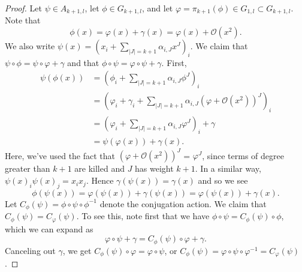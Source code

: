 \documentclass[10pt,a4paper]{amsart}
\begin{document}
\begin{proof}
Let $\psi \in A_{k+1, l}$, let $\phi \in G_{k+1, l}$, and let $\varphi = \pi_{k+1}(\phi) \in G_{1,l} \subset G_{k+1,l}$. Note that 
\[
\phi(x) = \varphi(x) + \gamma(x) =\varphi(x) + \mathcal{O}(x^2). 
\]
We also write $\psi(x) = (x_{i} + \sum_{|J| = k+1} \alpha_{i, J} x^{J} )_{i}$. We claim that $\psi \circ \phi = \psi \circ \varphi + \gamma$ and that $\phi \circ \psi = \varphi \circ \psi + \gamma$. 
First, 
\begin{align*}
\psi (\phi(x)) &=  (\phi_{i} + \sum_{|J| = k+1} \alpha_{i, J} \phi^{J} )_{i} \\
&= (\varphi_{i} + \gamma_{i} + \sum_{|J| = k+1 } \alpha_{i, J} (\varphi + \mathcal{O}(x^2))^J)_{i} \\
&= (\varphi_{i} + \sum_{|J| = k+1} \alpha_{i, J} \varphi^{J} )_{i} + \gamma \\
&= \psi (\varphi(x)) + \gamma(x). 
\end{align*}
Here, we've used the fact that $ (\varphi + \mathcal{O}(x^2))^J$ = $\varphi^J$, since terms of degree greater than $k+1$ are killed and $J$ has weight $k+1$. In a similar way, $\psi(x)_{i} \psi(x)_{j} = x_{i} x_{j}$. Hence $\gamma(\psi(x)) = \gamma(x)$ and so we see 
\[
\phi(\psi(x)) = \varphi(\psi(x)) + \gamma(\psi(x)) = \varphi(\psi(x)) + \gamma(x). 
\]
Let $C_{\phi}(\psi) = \phi \circ \psi \circ \phi^{-1}$ denote the conjugation action. We claim that $C_{\phi}(\psi) = C_{\varphi}(\psi)$. To see this, note first that we have $\phi \circ \psi = C_{\phi}(\psi) \circ \phi$, which we can expand as 
\[
\varphi \circ \psi + \gamma = C_{\phi}(\psi) \circ \varphi + \gamma. 
\]
Canceling out $\gamma$, we get $C_{\phi}(\psi) \circ \varphi = \varphi \circ \psi$, or $C_{\phi}(\psi) = \varphi \circ \psi \circ \varphi^{-1} = C_{\varphi}(\psi)$.
\end{proof}
\end{document}
